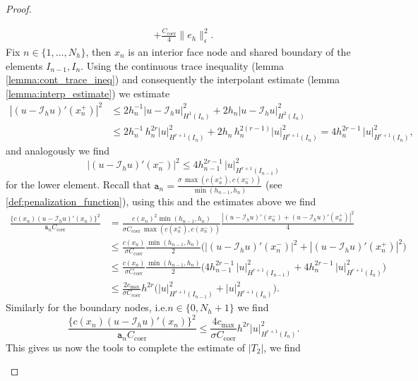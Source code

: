 \begin{proof}
\begin{proofstep}
\begin{align*}
			+ \frac{C_{\text{coer}}}{4} \|e_h\|_{\epsilon}^2.
		\end{align*}
		Fix $n \in \{1,\ldots,N_h\} $, then $x_n$ is an interior face node and shared boundary of the elements $I_{n-1}, I_n$. Using the continuous trace inequality 
		(lemma \ref{lemma:cont_trace_ineq}) and consequently the interpolant estimate (lemma \ref{lemma:interp_estimate}) we estimate
		\begin{align*}
			|(u - \mathcal{I}_h u)'(x_n^+)|^2 
			&\leq 2 h_n^{-1} |u - \mathcal{I}_h u|_{H^1(I_n)}^2 + 2 h_n |u - \mathcal{I}_h u|_{H^2(I_n)}^2 \\
			&\leq 2 h_n^{-1} \, h_n^{2r} |u|_{H^{r+1}(I_n)}^2 + 2 h_n\, h_n^{2(r-1)} |u|_{H^{r+1}(I_n)}^2 
			= 4 h_n^{2r-1} \, |u|_{H^{r+1}(I_n)}^2,
		\end{align*}
		and analogously we find 
		\begin{equation*}
			|(u - \mathcal{I}_h u)'(x_n^-)|^2 \leq 4 h_{n-1}^{2r-1} \, |u|_{H^{r+1}(I_{n-1})}^2
		\end{equation*}
		for the lower element. Recall that $\displaystyle \texttt{a}_n = \frac{\sigma \, \max(c(x_n^+), c(x_n^-))}{\min(h_{n-1}, h_{n})}$ (see \ref{def:penalization_function}), using this 
		and the estimates above we find 
		\begin{align*}
			\frac{\{c(x_n)(u - \mathcal{I}_h u)'(x_n)\}^2}{\texttt{a}_n C_{\text{coer}}}
			&= \frac{c(x_n)^2 \min(h_{n-1}, h_n)}{\sigma C_{\text{coer}}\, \max(c(x_n^+), c(x_n^-))} \frac{| (u-\mathcal{I}_h u)'(x_n^-) + (u-\mathcal{I}_h u)'(x_n^+) |^2}{4}  \\
			&\leq \frac{c(x_n)}{\sigma C_{\text{coer}}} \frac{\min(h_{n-1}, h_{n})}{2}\Big( |(u-\mathcal{I}_h u)'(x_n^-)|^2 + |(u-\mathcal{I}_h u)'(x_n^+)|^2 \Big) \\
			& \leq \frac{c(x_n)}{\sigma C_{\text{coer}}} \frac{\min(h_{n-1}, h_{n})}{2}\Big( 4 h_{n-1}^{2r-1} \, |u|_{H^{r+1}(I_{n-1})}^2 + 4 h_{n}^{2r-1} \, |u|_{H^{r+1}(I_{n})}^2\Big) \\
			& \leq \frac{2 c_{\max}}{\sigma C_{\text{coer}}} h^{2r} \Big(|u|_{H^{r+1}(I_{n-1})}^2 + |u|_{H^{r+1}(I_{n})}^2 \Big).
		\end{align*}
		Similarly for the boundary nodes, i.e.\@ $n \in \{0, N_h+1\}$ we find 
		\begin{equation*}
			\frac{\{c(x_{n})(u - \mathcal{I}_h u)'(x_{n})\}^2}{\texttt{a}_{n} C_{\text{coer}}} 
			\leq \frac{4 c_{\max}}{\sigma C_{\text{coer}}} h^{2r} |u|^2_{H^{r+1}(I_{n})}.
		\end{equation*}
		This gives us now the tools to complete the estimate of $|T_2|$, we find

\end{proofstep}
\end{proof}
